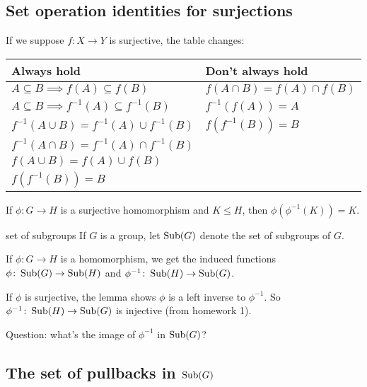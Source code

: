 \documentclass[12pt,letterpaper]{report}
\begin{document}
\pagebreak
\subsection{Set operation identities for surjections}

If we suppose $f \colon X \to Y$ is surjective, the table changes:

\begin{center}
  \renewcommand{\arraystretch}{1.5}
  \begin{tabular}{ll}
    Always hold                                            & Don't always hold \\
    \hline
    $A \subseteq B \implies f(A) \subseteq f(B)$           & $f(A \cap B) = f(A) \cap f(B)$ \\
    $A \subseteq B \implies f^{-1}(A) \subseteq f^{-1}(B) \qquad$ & $f^{-1}(f(A)) = A$ \\
    $f^{-1}(A \cup B) = f^{-1}(A) \cup f^{-1}(B)$          & \sout{$f(f^{-1}(B)) = B$} \\
    $f^{-1}(A \cap B) = f^{-1}(A) \cap f^{-1}(B)$          & \\
    $f(A \cup B) = f(A) \cup f(B)$                         & \\
    $f(f^{-1}(B)) = B$                                     & \\
  \end{tabular}
\end{center}

\begin{lem}{}{}
  If $\phi \colon G \to H$ is a surjective homomorphism and $K \leq H$, then
  $\phi(\phi^{-1}(K)) = K$.
\end{lem}

\begin{defn}{set of subgroups}{}
  If $G$ is a group, let $\operatorname{Sub}(G)$ denote the set of subgroups of $G$.
\end{defn}

If $\phi \colon G \to H$ is a homomorphism, we get the induced functions
$\phi \colon \operatorname{Sub}(G) \to \operatorname{Sub}(H)$ and $\phi^{-1} \colon \operatorname{Sub}(H) \to \operatorname{Sub}(G)$.

If $\phi$ is surjective, the lemma shows $\phi$ is a left inverse to $\phi^{-1}$.
So $\phi^{-1} \colon \operatorname{Sub}(H) \to \operatorname{Sub}(G)$ is injective (from homework 1).

Question: what's the image of $\phi^{-1}$ in $\operatorname{Sub}(G)$?

\pagebreak
\subsection[The set of pullbacks in Sub(G)]{The set of pullbacks in $\operatorname{Sub}(G)$}
\end{document}
